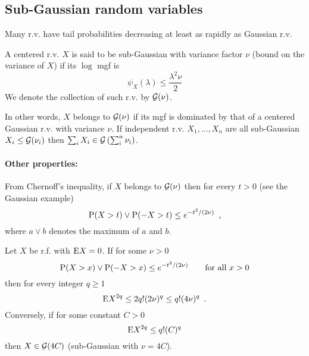 \subsection{Sub-Gaussian random variables}\label{sec:SubGaussian}
Many r.v. have tail probabilities decreasing at least as rapidly as Gaussian r.v.

\begin{definition}
A centered r.v. $X$ is said to be sub-Gaussian with variance factor $\nu$ (bound on the variance of $X$) if its $\log$ mgf is
\begin{equation}
\psi_X(\lambda) \leq \frac{\lambda^2 \nu}{2}
\end{equation}
We denote the collection of such r.v. by $\mathcal{G}(\nu)$.
\end{definition}
In other words, $X$ belongs to $\mathcal{G}(\nu)$ if its mgf is dominated by that of a centered Gaussian r.v. with variance $\nu$.
If independent r.v. $X_1, \ldots, X_n$ are all sub-Gaussian $X_i \leq \mathcal{G}(\nu_i)$ then $\sum_i X_i \in \mathcal{G} \left(\sum_i^n \nu_i\right)$.

\paragraph{Other properties:}

From Chernoff's inequality, if $X$ belongs to $\mathcal{G}(\nu)$ then for every $t > 0$ (see the Gaussian example)
\begin{equation}
\mathrm{P}(X > t) \lor \mathrm{P}(-X > t) \leq e^{- t^2/(2\nu)} \enspace ,
\end{equation}
where $a \lor b$ denotes the maximum of $a$ and $b$.

\begin{theorem}
Let $X$ be r.f. with $\mathrm{E} X = 0$. If for some $\nu > 0$ 
\begin{equation*}
\mathrm{P}(X > x) \lor \mathrm{P}(-X > x) \leq e^{- t^2/(2\nu)} \qquad \text{for all } x > 0
\end{equation*}
then for every integer $q \geq 1$
\begin{equation}\label{eq:bound_esauared}
\mathrm{E} X^{2q} \leq 2q!(2\nu)^q \leq q!(4\nu)^q \enspace .
\end{equation}
Conversely, if for some constant $C > 0$
\begin{equation*}
\mathrm{E} X^{2q} \leq q!(C)^q
\end{equation*}
then $X \in \mathcal{G}(4C)$ (sub-Gaussian with $\nu = 4C$).
\end{theorem}


